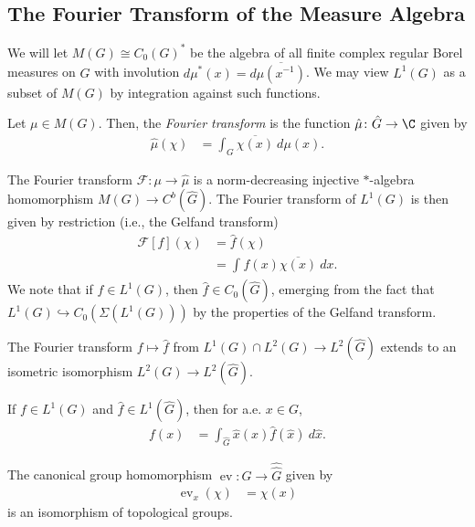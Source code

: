 \documentclass[10pt]{mypackage}
\begin{document}
\subsection{The Fourier Transform of the Measure Algebra}%
We will let $M(G)\cong C_0\left( G \right)^{\ast}$ be the algebra of all finite complex regular Borel measures on $G$ with involution $d\mu^{\ast}\left( x \right) = d \overline{\mu\left( x^{-1} \right)}$. We may view $L^1\left( G \right)$ as a subset of $M(G)$ by integration against such functions.
\begin{definition}
  Let $\mu\in M(G)$. Then, the \textit{Fourier transform} is the function $\hat{\mu}\colon \hat{G}\to \C$ given by
  \begin{align*}
    \hat{\mu}\left( \chi \right) &= \int_{G}^{} \overline{\chi(x)}\:d\mu(x).
  \end{align*}
\end{definition}
The Fourier transform $\mathcal{F}\colon \mu\to \hat{\mu}$ is a norm-decreasing injective $\ast$-algebra homomorphism $M(G)\to C^b\left( \hat{G} \right)$. The Fourier transform of $L^1\left( G \right)$ is then given by restriction (i.e., the Gelfand transform)
\begin{align*}
  \mathcal{F}[f]\left( \chi \right) &= \hat{f}\left( \chi \right)\\
                                                   &= \int_{}^{} f(x) \overline{\chi(x)}\:dx.
\end{align*}
We note that if $f\in L^1\left( G \right)$, then $\hat{f}\in C_0\left( \hat{G} \right)$, emerging from the fact that $L^1\left( G \right)\hookrightarrow C_0\left( \Sigma\left( L^1\left( G \right) \right) \right)$ by the properties of the Gelfand transform.
\begin{theorem}
  The Fourier transform $f\mapsto \hat{f}$ from $L^1\left( G \right)\cap L^2\left( G \right)\to L^2\left( \hat{G} \right)$ extends to an isometric isomorphism $L^2\left( G \right)\to L^2\left( \hat{G} \right)$.
\end{theorem}
\begin{theorem}
  If $f\in L^1\left( G \right)$ and $\hat{f}\in L^1\left( \hat{G} \right)$, then for a.e. $x\in G$,
  \begin{align*}
    f(x) &= \int_{\hat{G}}^{} \hat{x}\left( x \right)\hat{f}\left( \hat{x} \right)\:d\hat{x}.
  \end{align*}
\end{theorem}
\begin{theorem}
  The canonical group homomorphism $\operatorname{ev}\colon G\to \hat{\hat{G}}$ given by
  \begin{align*}
    \operatorname{ev}_x\left( \chi \right) &= \chi(x)
  \end{align*}
  is an isomorphism of topological groups.
\end{theorem}
\end{document}
